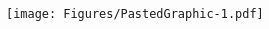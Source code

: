 \documentclass[ima, 20pt, portrait, plainboxedsections]{sciposter}
\begin{document}
\begin{multicols}{3}
\begin{itemize}
\end{itemize}  
  
 \begin{figure}[ht!]
\centering
\texttt{[image: Figures/PastedGraphic-1.pdf]}
\end{figure} 
  
  






%
%

\end{multicols}
\end{document}
